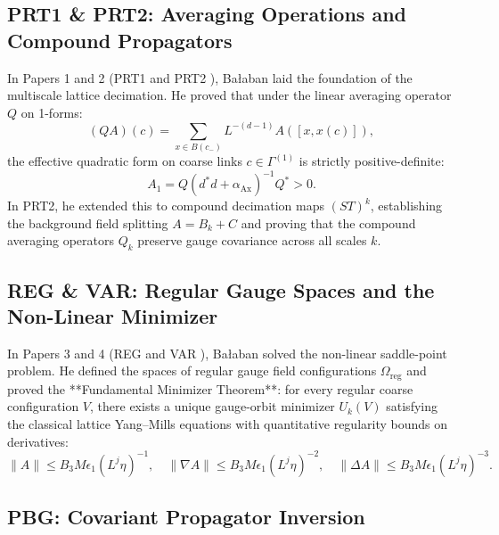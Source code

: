\subsection{PRT1 \& PRT2: Averaging Operations and Compound Propagators}
\label{subsec:prt1_prt2_summary}

In Papers 1 and 2 (PRT1 \cite{Balaban1984} and PRT2 \cite{Balaban1984b}), Ba\l aban laid the foundation of the multiscale lattice decimation. He proved that under the linear averaging operator $Q$ on 1-forms:
\begin{equation}
(QA)(c) = \sum_{x \in B(c_-)} L^{-(d-1)} A([x, x(c)]),
\end{equation}
the effective quadratic form on coarse links $c \in \Gamma^{(1)}$ is strictly positive-definite:
\begin{equation}
A_1 = Q \left( d^* d + \alpha_{\mathrm{Ax}} \right)^{-1} Q^* > 0.
\end{equation}
In PRT2, he extended this to compound decimation maps $(ST)^k$, establishing the background field splitting $A = B_k + C$ and proving that the compound averaging operators $Q_k$ preserve gauge covariance across all scales $k$.

\subsection{REG \& VAR: Regular Gauge Spaces and the Non-Linear Minimizer}
\label{subsec:reg_var_summary}

In Papers 3 and 4 (REG \cite{Balaban1985b} and VAR \cite{Balaban1985c}), Ba\l aban solved the non-linear saddle-point problem. He defined the spaces of regular gauge field configurations $\Omega_{\mathrm{reg}}$ and proved the **Fundamental Minimizer Theorem**: for every regular coarse configuration $V$, there exists a unique gauge-orbit minimizer $U_k(V)$ satisfying the classical lattice Yang--Mills equations with quantitative regularity bounds on derivatives:
\begin{equation}
\label{eq:ch12_minimizer_bounds}
\|A\| \le B_3 M \epsilon_1 (L^j \eta)^{-1}, \quad \|\nabla A\| \le B_3 M \epsilon_1 (L^j \eta)^{-2}, \quad \|\Delta A\| \le B_3 M \epsilon_1 (L^j \eta)^{-3}.
\end{equation}

\subsection{PBG: Covariant Propagator Inversion}
\label{subsec:pbg_summary}

